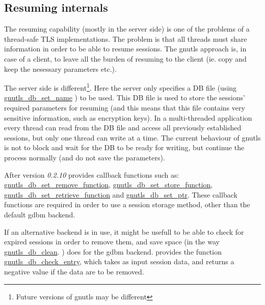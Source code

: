 \subsection{Resuming internals}
The resuming capability (mostly in the server side) is one of the problems of a thread-safe TLS
implementations. The problem is that all threads must share information in
order to be able to resume sessions. The gnutls approach is, in case of a
client, to leave all the burden of resuming to the client (ie. copy and keep the
nesessary parameters etc.).
\par
The server side is different\footnote{Future versions of gnutls may be
different}. 
Here the server only specifies a DB file (using 
\hyperref{gnutls\_db\_set\_name()}{gnutls\_db\_set\_name() (see Section }{ for more
information)}{gnutls_db_set_name}
) to be used. This DB file is used to store the sessions' required parameters for
resuming (and this means that this file contains very sensitive information,
such as encryption keys). In a multi-threaded application every thread can
read from the DB file and access all previously established sessions, but
only one thread can write at a time. The current behaviour of gnutls is
not to block and wait for the DB to be ready for writing, but continue the
process normally (and do not save the parameters).  
\par
 After version {\emph{0.2.10}} \gnutls provides callback functions such as:
\hyperref{gnutls\_db\_set\_remove\_function()}{gnutls\_db\_set\_remove\_function() (see Section }{ for more
information)}{gnutls_db_set_remove_function},
\hyperref{gnutls\_db\_set\_store\_function()}{gnutls\_db\_set\_store\_function() (see Section }{ for more
information)}{gnutls_db_set_store_function},
\hyperref{gnutls\_db\_set\_retrieve\_function()}{gnutls\_db\_set\_retrieve\_function() (see Section }{ for more
information)}{gnutls_db_set_retrieve_function} and
\hyperref{gnutls\_db\_set\_ptr()}{gnutls\_db\_set\_ptr() (see Section }{ for more
information)}{gnutls_db_set_ptr}.
These callback functions are required in order to use a session
storage method, other than the default gdbm backend. 
\par
If an alternative backend is in use, it might be usefull to be able to check
for expired sessions in order to remove them, and save space (in the way 
\hyperref{gnutls\_db\_clean()}{gnutls\_db\_clean() (see Section }{ for more
information)}{gnutls_db_clean}.
) does for the gdbm backend. \gnutls provides the function
\hyperref{gnutls\_db\_check\_entry()}{gnutls\_db\_check\_entry() (see Section }{ for more
information)}{gnutls_db_check_entry}, which takes as input session data, and
returns a negative value if the data are to be removed.

